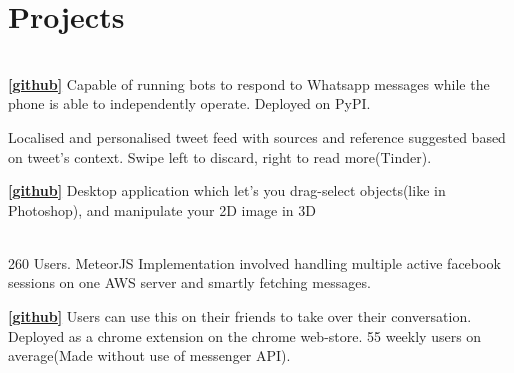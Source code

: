 \documentclass[]{deedy-resume-openfont}
\begin{document}
\begin{minipage}[t]{0.66\textwidth}
\section{Projects}
\\
\textbf{\href{https://github.com/mukulhase/WhatsAPI}{[\underline{github}]}} Capable of running bots to respond to Whatsapp messages while the phone is able to independently operate. Deployed on PyPI.
\sectionsep

Localised and personalised tweet feed with sources and reference suggested based on tweet’s context. Swipe left to discard, right to read more(Tinder).
\sectionsep

\textbf{\href{https://github.com/mukulhase/3-Sweep-Library}{[\underline{github}]}} Desktop application which let's you drag-select objects(like in Photoshop), and manipulate your 2D image in 3D
\sectionsep

 \\
260 Users. MeteorJS Implementation involved handling multiple active facebook sessions on one AWS server and smartly fetching messages.
\sectionsep


\textbf{\href{https://github.com/NMBL/CleverFB}{[\underline{github}]}} Users can use this on their friends to take over their conversation. Deployed as a chrome extension on the chrome web-store. 55 weekly users on average(Made without use of messenger API).
\sectionsep 






\end{minipage}
\end{document}
